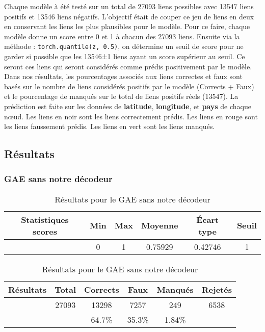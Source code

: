 \documentclass{article}
\begin{document}
Chaque modèle à été testé sur un total de 27093 liens possibles avec 13547 liens positifs et 13546 liens négatifs. L’objectif était de couper ce jeu de liens en deux en conservant les liens les plus plausibles pour le modèle. Pour ce faire, chaque modèle donne un score entre 0 et 1 à chacun des 27093 liens. Ensuite via la méthode : \texttt{torch.quantile(z, 0.5)}, on détermine un seuil de score pour ne garder si possible que les 13546±1 liens ayant un score supérieur au seuil. Ce seront ces liens qui seront considérés comme prédis positivement par le modèle. Dans nos résultats, les pourcentages associés aux liens correctes et faux sont basés sur le nombre de liens considérés positifs par le modèle (Corrects + Faux) et le pourcentage de manqués sur le total de liens positifs réels (13547).
La prédiction est faite sur les données de \textbf{latitude}, \textbf{longitude},  et \textbf{pays} de chaque nœud.\newline
\newline
Les liens en noir sont les liens correctement prédis.\newline
Les liens en rouge sont les liens faussement prédis.\newline
Les liens en vert sont les liens manqués.

\subsection{Résultats}
\subsubsection{GAE sans notre décodeur}

\begin{table}
    \centering
    \begin{tabular}{|c|c|c|c|c|c|}
        \hline
        Statistiques scores & Min & Max & Moyenne & Écart type & Seuil\\
        \hline
         & 0 & 1 & 0.75929 & 0.42746 & 1 \\
         \hline
    \end{tabular}
    \begin{tabular}{|c|c|c|c|c|c|}
        \hline
        Résultats & Total & Corrects & Faux & Manqués & Rejetés\\
        \hline
         & 27093 & 13298 & 7257 & 249 & 6538\\
        \hline
         &  & 64.7\% & 35.3\% & 1.84\% & \\
        \hline
    \end{tabular}
    \caption{Résultats pour le GAE sans notre décodeur}
    \label{tab:my_label}
\end{table}
\end{document}
